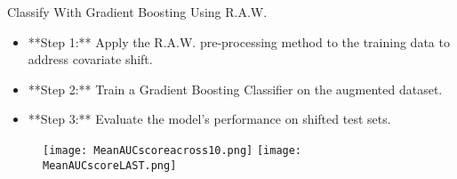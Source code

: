 \begin{frame}{Classify With Gradient Boosting Using R.A.W.}
    \begin{itemize}
        \item **Step 1:** Apply the R.A.W. pre-processing method to the training data to address covariate shift.
        \item **Step 2:** Train a Gradient Boosting Classifier on the augmented dataset.
        \item **Step 3:** Evaluate the model's performance on shifted test sets.
    \end{itemize}
    
    \vspace{1em}
    \begin{figure}
        \centering
        \texttt{[image: MeanAUCscoreacross10.png]}
        \hfill
        \texttt{[image: MeanAUCscoreLAST.png]}
    \end{figure}
    
\end{frame}




